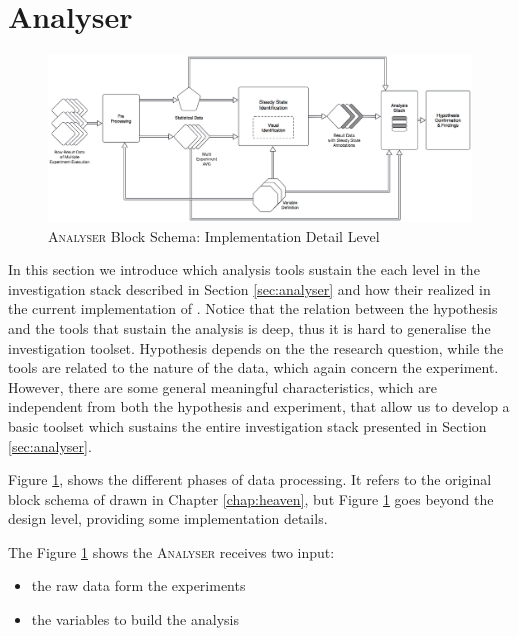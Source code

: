 \section{Analyser}\label{sec:analyser-impl}

\begin{figure}[tbh]
  \centering
	\includegraphics[width=\linewidth]{images/analyser-block-schema-impl}
	\caption[\textsc{Analyser} Block Schema: Implementation Detail Level]{\textsc{Analyser} Block Schema: Implementation Detail Level}
  	\label{fig:analyser-block-schema-impl}
\end{figure}

\noindent In this section we introduce which analysis tools sustain the each level in the investigation stack described in Section \ref{sec:analyser} and how their realized in the current implementation of \name. Notice that the relation between the hypothesis and the tools that sustain the analysis is deep, thus it is hard to generalise the investigation toolset. Hypothesis depends on the the research question, while the tools are related to the nature of the data, which again concern the experiment.  However, there are some general meaningful characteristics, which are independent from both the hypothesis and experiment, that allow us to develop a basic toolset which sustains the entire investigation stack presented in Section \ref{sec:analyser}.

Figure \ref{fig:analyser-block-schema-impl}, shows the different phases of data processing. It refers to the original block schema of drawn in Chapter \ref{chap:heaven}, but Figure \ref{fig:analyser-block-schema-impl} goes beyond the design level, providing some implementation details. 

The Figure \ref{fig:analyser-block-schema-impl} shows the \textsc{Analyser} receives two input:
\begin{itemize}
\item the raw data form the experiments
\item the variables to build the analysis
\end{itemize}


